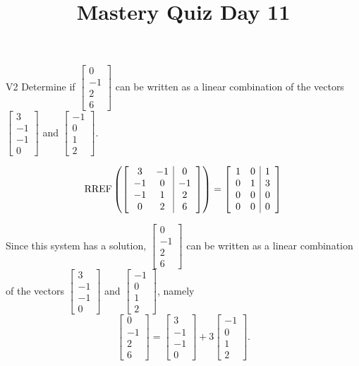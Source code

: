 \documentclass{sbgLAquiz}
\title{Mastery Quiz Day 11 }
\begin{document}
\begin{problem}{V2}
Determine if $\begin{bmatrix}0 \\ -1 \\ 2 \\ 6 \end{bmatrix}$ can be written as a linear combination of the vectors $\begin{bmatrix} 3 \\ -1 \\ -1 \\ 0 \end{bmatrix}$ and $\begin{bmatrix} -1 \\ 0 \\ 1 \\ 2 \end{bmatrix}$.
\end{problem}
\begin{solution}
$$\operatorname{RREF}\left(\left[\begin{array}{cc|c} 3 & -1 & 0 \\ -1 & 0 & -1 \\ -1 & 1 & 2 \\ 0 & 2 & 6\end{array} \right] \right)= \left[ \begin{array}{cc|c} 1 & 0 & 1 \\ 0 & 1 & 3 \\ 0 & 0 & 0 \\ 0 & 0 & 0 \end{array} \right]$$

Since this system has a solution, $\begin{bmatrix}0 \\ -1 \\ 2 \\ 6 \end{bmatrix}$ can be written as a linear combination of the vectors $\begin{bmatrix} 3 \\ -1 \\ -1 \\ 0 \end{bmatrix}$ and $\begin{bmatrix} -1 \\ 0 \\ 1 \\ 2 \end{bmatrix}$, namely
$$\begin{bmatrix}0 \\ -1 \\ 2 \\ 6 \end{bmatrix}=\begin{bmatrix} 3 \\ -1 \\ -1 \\ 0 \end{bmatrix}+3\begin{bmatrix} -1 \\ 0 \\ 1 \\ 2 \end{bmatrix}.$$
\end{solution}
\end{document}
